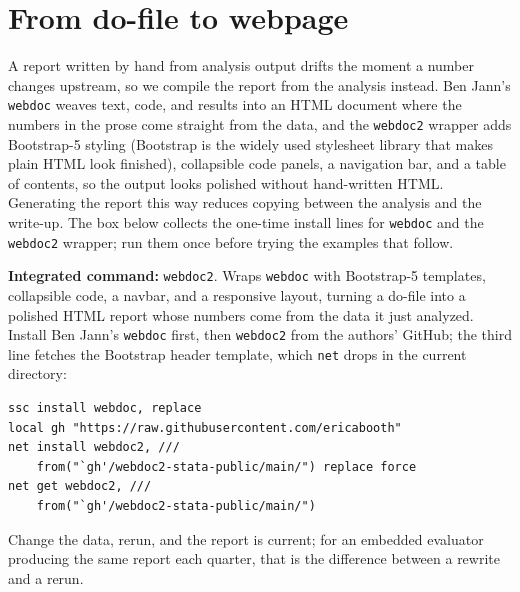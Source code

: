 \documentclass[
    a4paper,
    fontsize=10pt,
    twoside=true,
    numbers=noenddot,
]{kaobook}
\begin{document}
\section{From do-file to webpage}
A report written by hand from analysis output drifts the moment a number changes upstream, so we compile the report from the analysis instead. Ben Jann's \texttt{webdoc} weaves text, code, and results into an HTML document where the numbers in the prose come straight from the data, and the \texttt{webdoc2} wrapper adds Bootstrap-5 styling (Bootstrap is the widely used stylesheet library that makes plain HTML look finished), collapsible code panels, a navigation bar, and a table of contents, so the output looks polished without hand-written HTML. Generating the report this way reduces copying between the analysis and the write-up. The box below collects the one-time install lines for \texttt{webdoc} and the \texttt{webdoc2} wrapper; run them once before trying the examples that follow.

\begin{kaobox}[frametitle=Package Integration: \texttt{webdoc2}]
\textbf{Integrated command:} \texttt{webdoc2}. Wraps \texttt{webdoc} with Bootstrap-5 templates, collapsible code, a navbar, and a responsive layout, turning a do-file into a polished HTML report whose numbers come from the data it just analyzed. Install Ben Jann's \texttt{webdoc} first, then \texttt{webdoc2} from the authors' GitHub; the third line fetches the Bootstrap header template, which \texttt{net} drops in the current directory:
\par
{\footnotesize
\begin{verbatim}
ssc install webdoc, replace
local gh "https://raw.githubusercontent.com/ericabooth"
net install webdoc2, ///
    from("`gh'/webdoc2-stata-public/main/") replace force
net get webdoc2, ///
    from("`gh'/webdoc2-stata-public/main/")
\end{verbatim}
}
\end{kaobox}

Change the data, rerun, and the report is current; for an embedded evaluator producing the same report each quarter, that is the difference between a rewrite and a rerun.
\end{document}
